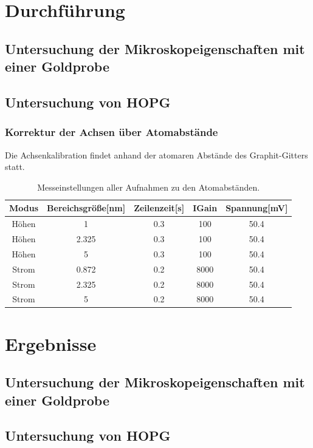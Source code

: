 \documentclass[12pt,a4paper]{article}
\begin{document}
\section{Durchführung}
\subsection{Untersuchung der Mikroskopeigenschaften mit einer Goldprobe}
\subsection{Untersuchung von HOPG}

\subsubsection{Korrektur der Achsen über Atomabstände}
Die Achsenkalibration findet anhand der atomaren Abstände des Graphit-Gitters statt.\\

\begin{table}
\centering
\begin{tabular}{|c|c|c|c|c|}
\hline 
Modus & Bereichsgröße[nm] & Zeilenzeit[s] & IGain & Spannung[mV]\\ 
\hline 
Höhen & 1 & 0.3 & 100 & 50.4\\ 
\hline 
Höhen & 2.325 & 0.3 & 100 & 50.4\\ 
\hline 
Höhen & 5 & 0.3 & 100 & 50.4\\ 
\hline 
Strom & 0.872 & 0.2 & 8000 & 50.4\\ 
\hline 
Strom & 2.325 & 0.2 & 8000 & 50.4\\ 
\hline 
Strom & 5 & 0.2 & 8000 & 50.4\\ 
\hline 
\end{tabular} 
\caption{Messeinstellungen aller Aufnahmen zu den Atomabständen.}
\label{tab:Atome_Einstellungen}
\end{table}

\section{Ergebnisse}
\subsection{Untersuchung der Mikroskopeigenschaften mit einer Goldprobe}

\subsection{Untersuchung von HOPG}
\end{document}
